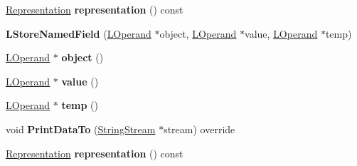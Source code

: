 \begin{DoxyCompactItemize}
\item 
\hyperlink{classv8_1_1internal_1_1_representation}{Representation} {\bfseries representation} () const \hypertarget{classv8_1_1internal_1_1_l_store_named_field_acf09ef122d9ca6738894c92b8f3e24ef}{}\label{classv8_1_1internal_1_1_l_store_named_field_acf09ef122d9ca6738894c92b8f3e24ef}

\item 
{\bfseries L\+Store\+Named\+Field} (\hyperlink{classv8_1_1internal_1_1_l_operand}{L\+Operand} $\ast$object, \hyperlink{classv8_1_1internal_1_1_l_operand}{L\+Operand} $\ast$value, \hyperlink{classv8_1_1internal_1_1_l_operand}{L\+Operand} $\ast$temp)\hypertarget{classv8_1_1internal_1_1_l_store_named_field_a6d2a4f20bdb4927c9401f7f7dd706d15}{}\label{classv8_1_1internal_1_1_l_store_named_field_a6d2a4f20bdb4927c9401f7f7dd706d15}

\item 
\hyperlink{classv8_1_1internal_1_1_l_operand}{L\+Operand} $\ast$ {\bfseries object} ()\hypertarget{classv8_1_1internal_1_1_l_store_named_field_a322fe15f20a68dfd3429f31bb46ce109}{}\label{classv8_1_1internal_1_1_l_store_named_field_a322fe15f20a68dfd3429f31bb46ce109}

\item 
\hyperlink{classv8_1_1internal_1_1_l_operand}{L\+Operand} $\ast$ {\bfseries value} ()\hypertarget{classv8_1_1internal_1_1_l_store_named_field_a7c1b623b85070a53e7c8ca36113808c7}{}\label{classv8_1_1internal_1_1_l_store_named_field_a7c1b623b85070a53e7c8ca36113808c7}

\item 
\hyperlink{classv8_1_1internal_1_1_l_operand}{L\+Operand} $\ast$ {\bfseries temp} ()\hypertarget{classv8_1_1internal_1_1_l_store_named_field_ad77491ce510eaa0f150539ec8815c14f}{}\label{classv8_1_1internal_1_1_l_store_named_field_ad77491ce510eaa0f150539ec8815c14f}

\item 
void {\bfseries Print\+Data\+To} (\hyperlink{classv8_1_1internal_1_1_string_stream}{String\+Stream} $\ast$stream) override\hypertarget{classv8_1_1internal_1_1_l_store_named_field_a737f49c6847cd030f17c69b314c54b6c}{}\label{classv8_1_1internal_1_1_l_store_named_field_a737f49c6847cd030f17c69b314c54b6c}

\item 
\hyperlink{classv8_1_1internal_1_1_representation}{Representation} {\bfseries representation} () const \hypertarget{classv8_1_1internal_1_1_l_store_named_field_acf09ef122d9ca6738894c92b8f3e24ef}{}\label{classv8_1_1internal_1_1_l_store_named_field_acf09ef122d9ca6738894c92b8f3e24ef}


\end{DoxyCompactItemize}
